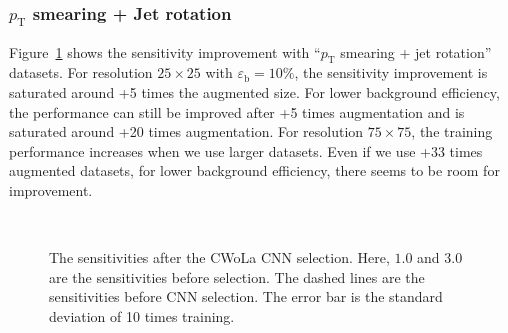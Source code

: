 \documentclass[12pt]{article}
\begin{document}
		\subsubsection{\texorpdfstring{$p_{\mathrm{T}}$}{pT} smearing + Jet rotation}%
		\label{subs:pt_smearing_jet_rotation}
			Figure~\ref{fig:sensitivity_improvement_origin_pt_jet_aug_SB_1_3} shows the sensitivity improvement with ``$p_{\text{T}}$ smearing + jet rotation'' datasets. For resolution $25\times 25$ with $\varepsilon_{\text{b}} = 10 \%$, the sensitivity improvement is saturated around +5 times the augmented size. For lower background efficiency, the performance can still be improved after +5 times augmentation and is saturated around +20 times augmentation. For resolution $75\times 75$, the training performance increases when we use larger datasets. Even if we use +33 times augmented datasets, for lower background efficiency, there seems to be room for improvement.
			\begin{figure}[htpb]
				\centering
				 \\
				\caption{The sensitivities after the CWoLa CNN selection. Here, $1.0$ and $3.0$ are the sensitivities before selection. The dashed lines are the sensitivities before CNN selection. The error bar is the standard deviation of 10 times training.}
				\label{fig:sensitivity_improvement_origin_pt_jet_aug_SB_1_3}
			\end{figure}
\end{document}
